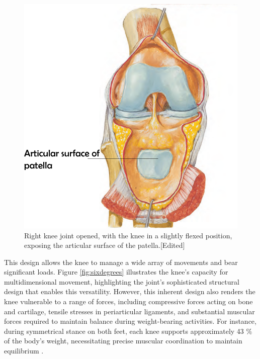 \documentclass{micro-econ-thesis}
\begin{document}
\begin{figure} [H]
	\centering
	\includegraphics[scale=0.3]{patellar_surface}
	\caption{Right knee joint opened, with the knee in a slightly flexed position, exposing the articular surface of the patella.[Edited] \parencite[p.517]{netter_519_2023}}
	\label{fig:patellarsurface}
\end{figure}

This design allows the knee to manage a wide array of movements and bear significant loads. Figure \ref{fig:sixdegrees} illustrates the knee's capacity for multidimensional movement, highlighting the joint's sophisticated structural design that enables this versatility. However, this inherent design also renders the knee vulnerable to a range of forces, including compressive forces acting on bone and cartilage, tensile stresses in periarticular ligaments, and substantial muscular forces required to maintain balance during weight-bearing activities. \parencite{standring_grays_2021} For instance, during symmetrical stance on both feet, each knee supports approximately 43 \% of the body's weight, necessitating precise muscular coordination to maintain equilibrium \parencite{maquet2012biomechanics}.
\end{document}

